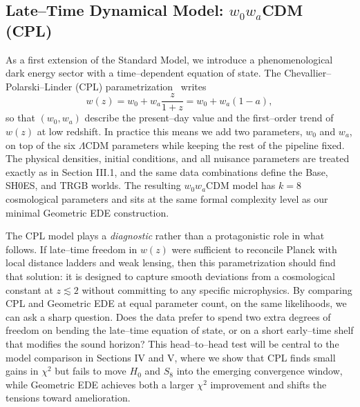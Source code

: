 \documentclass[a4paper,11pt]{article}
\begin{document}

\subsection{Late--Time Dynamical Model: $w_0 w_a$CDM (CPL)}
\label{sec:cpl}

As a first extension of the Standard Model, we introduce a phenomenological dark energy sector with a time--dependent equation of state. The Chevallier--Polarski--Linder (CPL) parametrization~\cite{Chevallier_Polarski,Linder_wz} writes
\begin{equation}
w(z) = w_0 + w_a \frac{z}{1+z} = w_0 + w_a(1-a),
\end{equation}
so that $(w_0, w_a)$ describe the present--day value and the first--order trend of $w(z)$ at low redshift. In practice this means we add two parameters, $w_0$ and $w_a$, on top of the six $\Lambda$CDM parameters while keeping the rest of the pipeline fixed. The physical densities, initial conditions, and all nuisance parameters are treated exactly as in Section III.1, and the same data combinations define the Base, SH0ES, and TRGB worlds. The resulting $w_0 w_a$CDM model has $k = 8$ cosmological parameters and sits at the same formal complexity level as our minimal Geometric EDE construction.

The CPL model plays a \emph{diagnostic} rather than a protagonistic role in what follows. If late--time freedom in $w(z)$ were sufficient to reconcile Planck with local distance ladders and weak lensing, then this parametrization should find that solution: it is designed to capture smooth deviations from a cosmological constant at $z \lesssim 2$ without committing to any specific microphysics. By comparing CPL and Geometric EDE at equal parameter count, on the same likelihoods, we can ask a sharp question. Does the data prefer to spend two extra degrees of freedom on bending the late--time equation of state, or on a short early--time shelf that modifies the sound horizon? This head--to--head test will be central to the model comparison in Sections IV and V, where we show that CPL finds small gains in $\chi^2$ but fails to move $H_0$ and $S_8$ into the emerging convergence window, while Geometric EDE achieves both a larger $\chi^2$ improvement and shifts the tensions toward amelioration.

\end{document}
